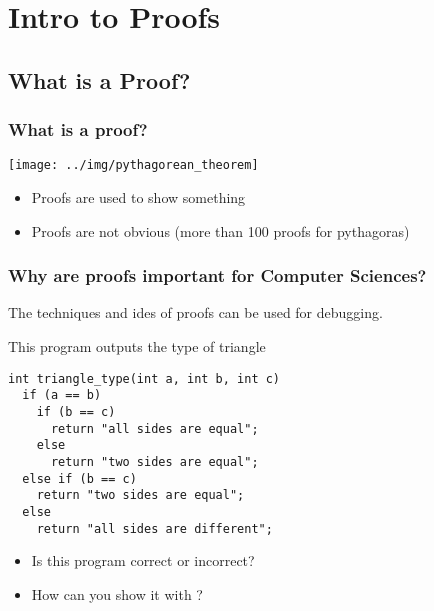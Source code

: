 \section{Intro to Proofs}

\frame{\tableofcontents[currentsection,hideallsubsections, firstsection=2, sections={2-5}]}

\subsection{What is a Proof?}

\begin{frame}
  \frametitle{What is a proof?}

  \begin{center}
    \texttt{[image: ../img/pythagorean\_theorem]}
  \end{center}
  \begin{itemize}
  \item Proofs are used to show  something
  \item Proofs are not obvious (more than 100 proofs for pythagoras)
  \end{itemize}
\end{frame}

\begin{frame}[fragile]
  \frametitle{Why are proofs important for Computer Sciences?}

  The techniques and ides of proofs can be used for \alert{debugging}.

  \begin{block}{This program outputs the type of triangle}
\begin{verbatim}
int triangle_type(int a, int b, int c)
  if (a == b)
    if (b == c)
      return "all sides are equal";
    else
      return "two sides are equal";
  else if (b == c)
    return "two sides are equal";
  else
    return "all sides are different";
\end{verbatim}
  \end{block}

  \begin{itemize}
  \item Is this program correct or incorrect?
  \item How can you show it with ?
  \end{itemize}
\end{frame}

